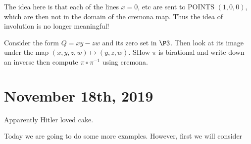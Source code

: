 \documentclass[12pt]{article}
\begin{document}
The idea here is that each of the lines $x=0$, etc are sent to POINTS $(1,0,0)$, which are then not in the domain of the cremona map.
Thus the idea of involution is no longer meaningful!

\begin{prob}
	Consider the form $Q=xy-zw$ and its zero set in $\P3$. Then look at its image under the map $(x,y,z,w)\mapsto(y,z,w)$. SHow $\pi$ is birational and write down an 
	inverse then compute $\pi\circ \pi^{-1}$ using cremona.
\end{prob}

\section{November 18th, 2019}
Apparently Hitler loved cake.

Today we are going to do some more examples. However, first we will consider 
\end{document}
